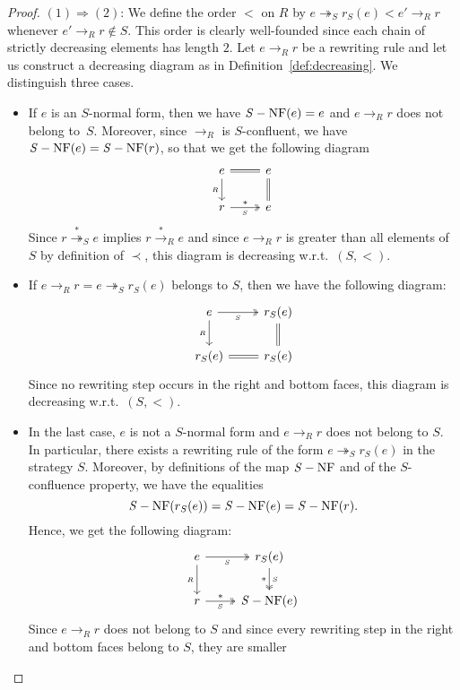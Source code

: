 \documentclass[10pt]{easychair}
\theoremstyle{definition}
\newcommand\rewR{\to_R}
\newcommand\rewS{\twoheadrightarrow_S}
\newcommand\transR{\overset{*}{\to}_R}
\newcommand\transS{\overset{*}{\twoheadrightarrow}_S}
\DeclareMathOperator{\SNF}{{\it S}-NF}
\begin{document}
\begin{proof}
  $(1)\Rightarrow (2)$: We define the order $<$ on $R$ by
  $e\rewS r_S(e)<e'\rewR r$ whenever $e'\rewR r\notin S$. This order is
  clearly well-founded since each chain of strictly decreasing elements
  has length $2$. Let $e\rewR r$ be a rewriting rule and let us construct
  a decreasing diagram as in Definition~\ref{def:decreasing}. We
  distinguish three cases.
  \begin{itemize}
  \item If $e$ is an $S$-normal form, then we have $\SNF(e)=e$ and
    $e\rewR r$ does not belong to~$S$. Moreover, since $\rewR$ is
    $S$-confluent, we have $\SNF(e)=\SNF(r)$, so that we get the
    following diagram
    \[\begin{tikzcd}
    e\ar[d, "_R"']\ar[r, equal] &
    e\ar[d, equal]\\
    r\ar[r, twoheadrightarrow, "*", "_S"'] & e
    \end{tikzcd}\]
    Since $r\transS e$ implies $r\transR e$ and since $e\rewR r$ is greater
    than all elements of $S$ by definition of $\prec$, this diagram is
    decreasing w.r.t.\ $(S,<)$.
  \item If $e\rewR r=e\rewS r_S(e)$ belongs to $S$, then we have the 
    following diagram:
    \[\begin{tikzcd}
    e\ar[r, twoheadrightarrow, "_S"']\ar[d, "_R"']
    & r_S(e) \ar[equal, d]\\
    r_S(e)\ar[r, equal] & r_S(e)
    \end{tikzcd}\]
    Since no rewriting step occurs in the right and bottom faces, this
    diagram is decreasing w.r.t.\ $(S,<)$.
  \item In the last case, $e$ is not a $S$-normal form and $e\rewR r$
    does not belong to $S$. In particular, there exists a rewriting rule
    of the form $e\rewS r_S(e)$ in the strategy $S$. Moreover, by
    definitions of the map $\SNF$ and of the $S$-confluence property, we
    have the equalities
    \[\SNF(r_S(e))=\SNF(e)=\SNF(r).
    \smallskip\]
    Hence, we get the following diagram:
    \[\begin{tikzcd}
    e\ar[d, "_R"']\ar[r, twoheadrightarrow, "_S"'] &
    r_S(e) \ar[twoheadrightarrow, , "_S", "*"', d] \\
    r \ar[r, twoheadrightarrow, "_S"', "*"] & \SNF (e)
    \end{tikzcd}\]
    Since $e\rewR r$ does not belong to $S$ and since every rewriting
    step in the right and bottom faces belong to $S$, they are smaller

\end{itemize}
\end{proof}
\end{document}

